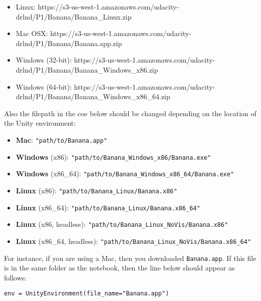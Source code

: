 \documentclass[11pt]{article}
\providecommand{\tightlist}{%
      \setlength{\itemsep}{0pt}\setlength{\parskip}{0pt}}
\begin{document}
\begin{itemize}
\tightlist
\item
  Linux:
  https://s3-us-west-1.amazonaws.com/udacity-drlnd/P1/Banana/Banana\_Linux.zip
\item
  Mac OSX:
  https://s3-us-west-1.amazonaws.com/udacity-drlnd/P1/Banana/Banana.app.zip
\item
  Windows (32-bit):
  https://s3-us-west-1.amazonaws.com/udacity-drlnd/P1/Banana/Banana\_Windows\_x86.zip
\item
  Windows (64-bit):
  https://s3-us-west-1.amazonaws.com/udacity-drlnd/P1/Banana/Banana\_Windows\_x86\_64.zip
\end{itemize}

Also the filepath in the coe below should be changed depending on the
location of the Unity environment:

\begin{itemize}
\tightlist
\item
  \textbf{Mac}: \texttt{"path/to/Banana.app"}
\item
  \textbf{Windows} (x86):
  \texttt{"path/to/Banana\_Windows\_x86/Banana.exe"}
\item
  \textbf{Windows} (x86\_64):
  \texttt{"path/to/Banana\_Windows\_x86\_64/Banana.exe"}
\item
  \textbf{Linux} (x86): \texttt{"path/to/Banana\_Linux/Banana.x86"}
\item
  \textbf{Linux} (x86\_64):
  \texttt{"path/to/Banana\_Linux/Banana.x86\_64"}
\item
  \textbf{Linux} (x86, headless):
  \texttt{"path/to/Banana\_Linux\_NoVis/Banana.x86"}
\item
  \textbf{Linux} (x86\_64, headless):
  \texttt{"path/to/Banana\_Linux\_NoVis/Banana.x86\_64"}
\end{itemize}

For instance, if you are using a Mac, then you downloaded
\texttt{Banana.app}. If this file is in the same folder as the notebook,
then the line below should appear as follows:

\begin{verbatim}
env = UnityEnvironment(file_name="Banana.app")
\end{verbatim}
\end{document}
